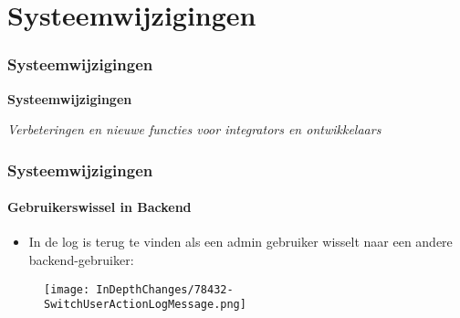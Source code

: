 %

\section{Systeemwijzigingen}
\begin{frame}[fragile]
	\frametitle{Systeemwijzigingen}

	\begin{center}\huge{\color{typo3darkgrey}\textbf{Systeemwijzigingen}}\end{center}
	\begin{center}\large{\textit{Verbeteringen en nieuwe functies voor integrators en ontwikkelaars}}\end{center}

\end{frame}


\begin{frame}[fragile]
	\frametitle{Systeemwijzigingen}
	\framesubtitle{Gebruikerswissel in Backend}

	\begin{itemize}
		\item In de log is terug te vinden als een admin gebruiker wisselt naar een andere backend-gebruiker:
	\end{itemize}

	\begin{figure}
		\texttt{[image: InDepthChanges/78432-SwitchUserActionLogMessage.png]}
	\end{figure}

\end{frame}


